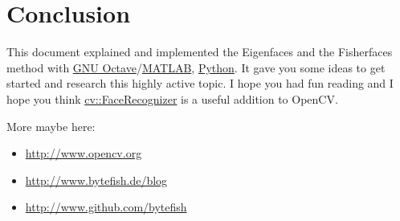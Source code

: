 \section{Conclusion}

This document explained and implemented the Eigenfaces \cite{PT91} and the Fisherfaces \cite{belhumeru97} method with \href{http://www.gnu.org/software/octave}{GNU Octave}/\href{http://mathworks.com}{MATLAB}, \href{http://www.python.org}{Python}. It gave you some ideas to get started and research this highly active topic. I hope you had fun reading and I hope you think \href{http://docs.opencv.org/trunk/modules/contrib/doc/facerec/facerec_api.html}{cv::FaceRecognizer} is a useful addition to OpenCV.

More maybe here: 

\begin{itemize}
    \item \url{http://www.opencv.org}
	\item \url{http://www.bytefish.de/blog}
	\item \url{http://www.github.com/bytefish}
\end{itemize}

